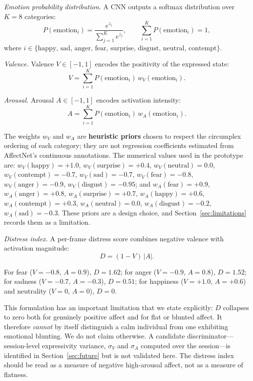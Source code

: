 \documentclass[12pt]{article}
\begin{document}
\emph{Emotion probability distribution.} A CNN outputs a softmax
distribution over $K=8$ categories:
\begin{equation}
P(\text{emotion}_i) = \frac{e^{z_i}}{\sum_{j=1}^{K} e^{z_j}},
\qquad \sum_{i=1}^{K} P(\text{emotion}_i) = 1,
\end{equation}
where $i \in \{\text{happy, sad, anger, fear, surprise, disgust, neutral,
contempt}\}$.

\emph{Valence.} Valence $V\in[-1,1]$ encodes the positivity of the
expressed state:
\begin{equation}
V = \sum_{i=1}^{K} P(\text{emotion}_i)\,w_V(\text{emotion}_i).
\end{equation}

\emph{Arousal.} Arousal $A\in[-1,1]$ encodes activation intensity:
\begin{equation}
A = \sum_{i=1}^{K} P(\text{emotion}_i)\,w_A(\text{emotion}_i).
\end{equation}

\noindent The weights $w_V$ and $w_A$ are \textbf{heuristic priors}
chosen to respect the circumplex ordering of each category; they are
not regression coefficients estimated from AffectNet's continuous
annotations. The numerical values used in the prototype are:
$w_V(\text{happy})=+1.0$, $w_V(\text{surprise})=+0.4$,
$w_V(\text{neutral})=0.0$, $w_V(\text{contempt})=-0.7$,
$w_V(\text{sad})=-0.7$, $w_V(\text{fear})=-0.8$,
$w_V(\text{anger})=-0.9$, $w_V(\text{disgust})=-0.95$; and
$w_A(\text{fear})=+0.9$, $w_A(\text{anger})=+0.8$,
$w_A(\text{surprise})=+0.7$, $w_A(\text{happy})=+0.6$,
$w_A(\text{contempt})=+0.3$, $w_A(\text{neutral})=0.0$,
$w_A(\text{disgust})=-0.2$, $w_A(\text{sad})=-0.3$. These priors are a
design choice, and Section~\ref{sec:limitations} records them as a
limitation.

\emph{Distress index.} A per-frame distress score combines negative
valence with activation magnitude:
\begin{equation}
D = (1 - V)\,|A| .
\end{equation}

\noindent For fear ($V=-0.8$, $A=0.9$), $D = 1.62$; for anger
($V=-0.9$, $A=0.8$), $D = 1.52$; for sadness ($V=-0.7$, $A=-0.3$),
$D = 0.51$; for happiness ($V=+1.0$, $A=+0.6$) and neutrality
($V=0$, $A=0$), $D = 0$.

This formulation has an important limitation that we state explicitly:
$D$ collapses to zero both for genuinely positive affect and for flat
or blunted affect. It therefore \emph{cannot} by itself distinguish a
calm individual from one exhibiting emotional blunting. We do not claim
otherwise. A candidate discriminator---session-level expressivity
variance, $\sigma_V$ and $\sigma_A$ computed over the session---is
identified in Section~\ref{sec:future} but is not validated here. The
distress index should be read as a measure of negative high-arousal
affect, not as a measure of flatness.
\end{document}
